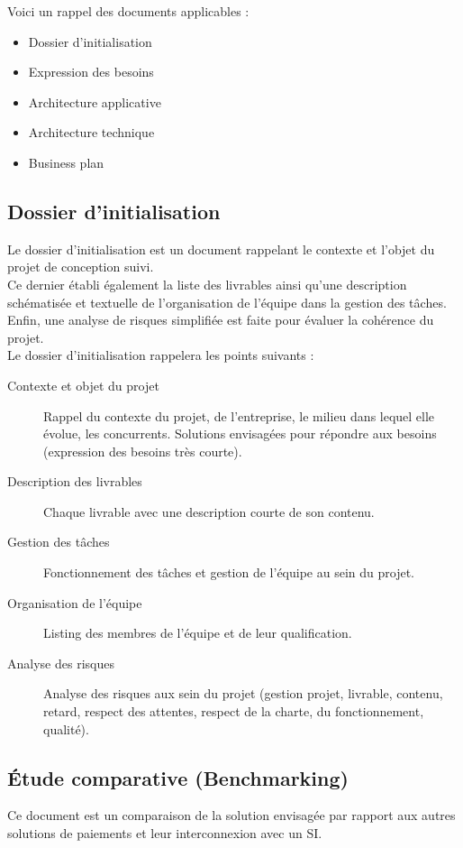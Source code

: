 Voici un rappel des documents applicables :
\begin{itemize}
  \item Dossier d'initialisation
  \item Expression des besoins
  \item Architecture applicative
  \item Architecture technique
  \item Business plan
\end{itemize}

\subsection{Dossier d'initialisation}
Le dossier d'initialisation est un document rappelant le contexte et l'objet du
projet de conception suivi. \\

Ce dernier établi également la liste des livrables ainsi qu'une description
schématisée et textuelle de l'organisation de l'équipe dans la gestion des
tâches. \\
Enfin, une analyse de risques simplifiée est faite pour évaluer la cohérence du
projet. \\

Le dossier d'initialisation rappelera les points suivants :
\begin{description}
  \item[Contexte et objet du projet] Rappel du contexte du projet, de
    l'entreprise, le milieu dans lequel elle évolue, les concurrents.
    Solutions envisagées pour répondre aux besoins (expression des besoins
    très courte).
  \item[Description des livrables] Chaque livrable avec une description courte
    de son contenu.
  \item[Gestion des tâches] Fonctionnement des tâches et gestion de l'équipe au
    sein du projet.
  \item[Organisation de l'équipe] Listing des membres de l'équipe et de leur
    qualification.
  \item[Analyse des risques] Analyse des risques aux sein du projet (gestion
    projet, livrable, contenu, retard, respect des attentes, respect de
    la charte, du fonctionnement, qualité).
\end{description}

\subsection{Étude comparative (Benchmarking)}
Ce document est un comparaison de la solution envisagée par rapport aux autres
solutions de paiements et leur interconnexion avec un SI. \\

